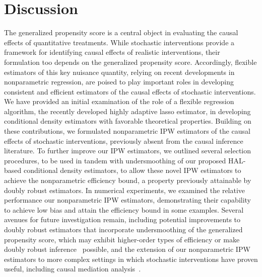 \section{Discussion}\label{discuss}

The generalized propensity score is a central object in evaluating the causal
effects of quantitative treatments. While stochastic interventions provide
a framework for identifying causal effects of realistic interventions, their
formulation too depends on the generalized propensity score. Accordingly,
flexible estimators of this key nuisance quantity, relying on recent
developments in nonparametric regression, are poised to play important roles in
developing consistent and efficient estimators of the causal effects of
stochastic interventions. We have provided an initial examination of the role of
a flexible regression algorithm, the recently developed highly adaptive lasso
estimator, in developing conditional density estimators with favorable
theoretical properties. Building on these contributions, we formulated
nonparametric IPW estimators of the causal effects of stochastic interventions,
previously absent from the causal inference literature. To further improve our
IPW estimators, we outlined several selection procedures, to be used in tandem
with undersmoothing of our proposed HAL-based conditional density estimators, to
allow these novel IPW estimators to achieve the nonparametric efficiency bound,
a property previously attainable by doubly robust estimators. In numerical
experiments, we examined the relative performance our nonparametric IPW
estimators, demonstrating their capability to achieve low bias and attain the
efficiency bound in some examples. Several avenues for future investigation
remain, including potential improvements to doubly robust estimators that
incorporate undersmoothing of the generalized propensity score, which may
exhibit higher-order types of efficiency or make doubly robust
inference~\citep[e.g.,][]{benkeser2017doubly} possible, and the extension of our
nonparametric IPW estimators to more complex settings in which stochastic
interventions have proven useful, including causal mediation
analysis~\citep[e.g.,][]{diaz2020causal}.
